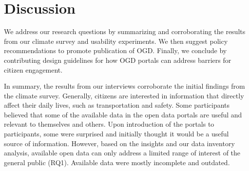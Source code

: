 \documentclass{sigchi}
\begin{document}


\section{Discussion}
We address our research questions by summarizing and corroborating the results from our climate survey and usability experiments. We then suggest policy recommendations to promote publication of OGD. Finally, we conclude by contributing design guidelines for how OGD portals can address barriers for citizen engagement. 

In summary, the results from our interviews corroborate the initial findings from the climate survey. Generally, citizens are interested in information that directly affect their daily lives, such as transportation and safety. Some participants believed that some of the available data in the open data portals are useful and relevant to themselves and others. Upon introduction of the portals to participants, some were surprised and initially thought it would be a useful source of information. However, based on the insights and our data inventory analysis, available open data can only address a limited range of interest of the general public (RQ1). Available data were mostly incomplete and outdated. 
\end{document}
